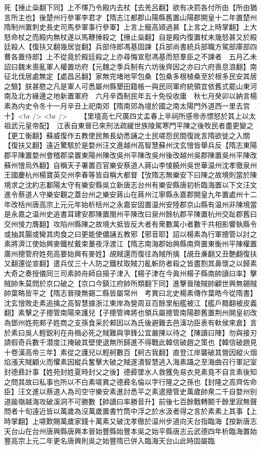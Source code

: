 死【捶止橤翻下同】上不懌乃令殿内去杖【去羌呂翻】欲有决罰各付所由【所由猶言所主也】後楚州行參軍李君才【隋志江都郡山陽縣舊置山陽郡開皇十二年置楚州隋制州置刺史長史司馬參軍事行參軍】上言上寵高熲過甚【上言之上時掌翻】上大怒命杖之而殿内無杖遂以馬鞭捶殺之【捶止橤翻】自是殿内復置杖未幾怒甚又於殿廷殺人【復扶又翻幾居豈翻】兵部侍郎馮基固諫【兵部尚書統兵部職方駕部庫部四曹各置侍郎】上不從竟於殿廷殺之上亦尋悔宣慰馮基而怒羣臣之不諫者　五月乙未詔曰魏末喪亂軍人權置坊府【元魏之季兵制有六坊後齊因之亦曰六府喪息浪翻】南征北伐居處無定【處昌呂翻】家無完堵地罕包桑【包桑多根植桑至於根多民安其居之驗】朕甚愍之凡是軍人可悉屬州縣墾田籍帳一與民同軍府統領宜依舊式罷山東河南及北方緣邊之地新置軍府　六月辛酉制民年五十免役收庸　秋七月癸卯以納言楊素為内史令冬十一月辛丑上祀南郊【隋南郊為壇於國之南太陽門外道西一里去宫十】<br />
<br />
　　【里壇高七尺廣四丈孟春上辛祠所感帝赤慓怒於其上以太祖武元皇帝配】　江表自東晉已來刑法疏緩世族陵駕寒門平陳之後牧民者盡更變之【更工衡翻】蘇威復作五教使民無長幼悉誦之士民嗟怨民間復訛言隋欲徙之入關【復扶又翻】遠近驚駭於是婺州汪文進越州高智慧蘇州沈玄懀皆舉兵反【隋志東陽郡平陳置婺州會稽郡梁置東陽州陳改吳州平陳改吳州後改越州吳郡陳置吳州平陳改蘇州懀烏外翻】自稱天子署置百官樂安蔡道人蔣山李㥄饒州吳世華温州沈孝徹泉州王國慶杭州楊寶英交州李春等皆自稱大都督【攷隋志無樂安下曰陳之故境則當於陳境求之沈約志鄱陽太守有樂安縣吳立新唐志台州有樂安縣唐初析臨海置以下文汪文進令蔡道人守樂安觀之蓋台州之樂安蔣山在蔣州江寧縣永嘉郡開皇九年置處州十二年改栝州唐高宗上元元年始析栝州之永嘉安固置温州安陸郡京山縣有温州非陳境當是永嘉之温州史追書耳建安郡陳置閩州平陳改曰泉州餘杭郡平陳置杭州交趾郡舊曰交州㥄力膺翻】攻陷州縣陳之故境大抵皆反大者有衆數萬小者數千共相影響執縣令或抽其腸或臠其肉食之曰更能使儂誦五教邪【邪音耶】詔以楊素為行軍摠管以討之素將濟江使始興麥鐵杖戴束藳夜浮渡江【隋志南海郡始興縣南齊置東衡州平陳權置廣州摠管府姓苑高要始興有麥姓】覘賊還而復往為賊所擒【覘丑亷翻又丑艶翻復扶又翻還從宣翻】遣兵仗三十人防之鐵杖取賊刀亂斬防者殺之皆盡割其鼻懷之以歸素大奇之奏授儀同三司素帥舟師自揚子津入【楊子津在今眞州楊子縣南帥讀曰率】擊賊帥朱莫問於京口破之【京口今鎮江府帥所類翻下同】進擊晉陵賊帥顧世興無錫賊帥葉略皆平之【隋志晉陵無錫二縣皆屬常州　考異曰北史楊素傳作葉皓今從隋書】沈玄懀敗走素追擒之高智慧據浙江東岸為營周亘百餘里船艦被江【艦戶黯翻被皮義翻】素擊之子摠管南陽來護兒【子摠管禆將也領兵屬摠管南陽郡舊置荆州開皇初改為鄧州姓苑郲子姓商之支孫食采於郲因以為氏後避難去邑漢功臣表有軑侯來倉】言於素曰吳人輕鋭利在舟楫必死之賊難與爭鋒公宜嚴陳以待之【陳讀曰陣】勿與接刃請假奇兵數千潜度江掩破其壁使退無所歸進不得戰此韓信破趙之策也【韓信破趙見十卷漢高帝三年】素從之護兒以輕舸數百【舸古我翻】直登江岸襲破其營因縱火烟焰漲天賊顧火而懼素因縱兵奮擊大破之賊遂潰智慧逃入海素躡之至海曲召行軍記室封德彞計事【姓苑封姓夏時封父之後】德彛墜水人救獲免易衣見素竟不自言素後知之問其故曰私事也所以不白素嗟異之德彛名倫以字行隆之之孫也【封隆之高齊佐命臣】汪文進以蔡道人為司空守樂安素進討悉平之素遣摠管史萬歲帥衆二千自婺州别道踰嶺越海攻破溪洞不可勝數【帥讀曰率勝音升】前後七百餘戰轉鬭千餘里寂無聲問者十旬遠近皆以萬歲為沒萬歲置書竹筒中浮之於水汲者得之言於素素上其事【上時掌翻】上嗟歎賜萬歲家錢十萬素又破沈孝徹於温州步道向天台指臨海【按新唐志天台山在台州唐興縣唐興本晉始豐縣始豐本吳之始平縣唐志云武德四年析臨海置始豐高宗上元二年更名唐興則吳之始豐隋已併入臨海天台山此時固屬臨
